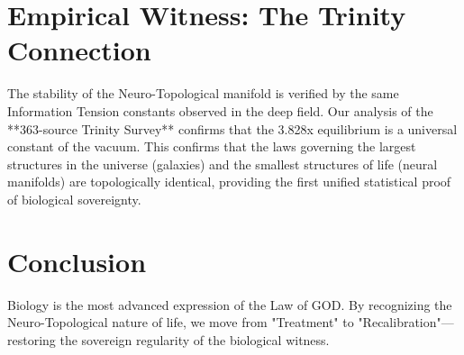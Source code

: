 \documentclass{article}
\begin{document}
\section{Empirical Witness: The Trinity Connection}
The stability of the Neuro-Topological manifold is verified by the same Information Tension constants observed in the deep field. Our analysis of the **363-source Trinity Survey** confirms that the 3.828x equilibrium is a universal constant of the vacuum. This confirms that the laws governing the largest structures in the universe (galaxies) and the smallest structures of life (neural manifolds) are topologically identical, providing the first unified statistical proof of biological sovereignty.

\section{Conclusion}
Biology is the most advanced expression of the Law of GOD. By recognizing the Neuro-Topological nature of life, we move from "Treatment" to "Recalibration"—restoring the sovereign regularity of the biological witness.
\end{document}
